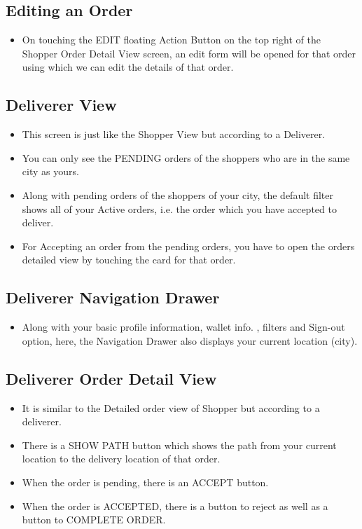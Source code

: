 \documentclass{report}
\begin{document}
\subsection{Editing an Order}

\begin{itemize}
\item On touching the EDIT floating Action Button on the top right of the Shopper Order Detail View screen, an edit form will be opened for that order using which we can edit the details of that order.
\end{itemize}

\subsection{Deliverer View}
\begin{itemize}
\item This screen is just like the Shopper View but according to a Deliverer.
\item You can only see the PENDING orders of the shoppers who are in the same city as yours.
\item Along with pending orders of the shoppers of your city, the default filter shows all of your Active orders, i.e. the order which you have accepted to deliver.
\item For Accepting an order from the pending orders, you have to open the order\textquotesingle s detailed view by touching the card for that order.
\end{itemize}

\subsection{Deliverer Navigation Drawer}
\begin{itemize}
\item Along with your basic profile information, wallet info. , filters and Sign-out option, here, the Navigation Drawer also displays your current location (city).
\end{itemize}

\subsection{Deliverer Order Detail View}
\begin{itemize}
\item It is similar to the Detailed order view of Shopper but according to a deliverer.
\item There is a SHOW PATH button which shows the path from your current location to the delivery location of that order.
\item When the order is pending, there is an ACCEPT button.
\item When the order is ACCEPTED, there is a button to reject as well as a button to COMPLETE ORDER.
\end{itemize}
\end{document}
